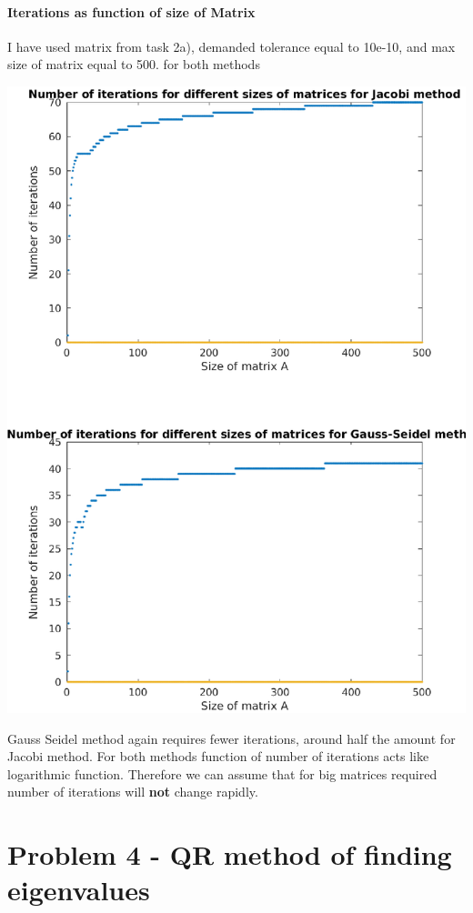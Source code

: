 \documentclass[12pt]{report}
\begin{document}
\subsubsection{Iterations as function of size of Matrix}
I have used matrix from task 2a), demanded tolerance equal to 10e-10, and max size of matrix equal to 500. for both methods
\begin{center}
   \includegraphics[scale=0.75]{iterations.eps}
\end{center}
Gauss Seidel method again requires fewer iterations, around half the amount for Jacobi method. For both methods function of number of iterations acts like logarithmic function. Therefore we can assume that for big matrices required number of iterations will \textbf{not} change rapidly.

\chapter{Problem 4 - QR method of finding eigenvalues}
\end{document}
